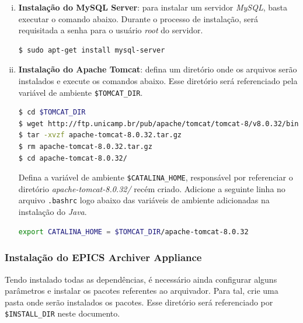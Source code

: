 \begin {enumerate}[i.]
\begin{lstlisting}[language=bash, style=nonumbers]
export JAVA_HOME="/usr/lib/jvm/java-8-openjdk-amd64"
export JRE_HOME="/usr/lib/jvm/java-8-openjdk-amd64/jre"
\end{lstlisting}

\item \textbf{Instalação do MySQL Server}: para instalar um servidor
\textit{MySQL}, basta executar o comando abaixo. Durante o processo de
instalação, será requisitada a senha para o usuário \textit{root} do servidor. 
\begin{lstlisting}[language=bash, style=nonumbers]
$ sudo apt-get install mysql-server
\end{lstlisting}

\item \textbf{Instalação do Apache Tomcat}: defina um diretório onde os arquivos
serão instalados e execute os comandos abaixo. Esse diretório será referenciado
pela variável de ambiente \texttt{\$TOMCAT\_DIR}.

\begin{lstlisting}[language=bash, style=nonumbers]
$ cd $TOMCAT_DIR
$ wget http://ftp.unicamp.br/pub/apache/tomcat/tomcat-8/v8.0.32/bin/apache-tomcat-8.0.32.tar.gz
$ tar -xvzf apache-tomcat-8.0.32.tar.gz
$ rm apache-tomcat-8.0.32.tar.gz
$ cd apache-tomcat-8.0.32/
\end{lstlisting}

Defina a variável de ambiente \texttt{\$CATALINA\_HOME}, responsável por
referenciar o diretório \textit{apache-tomcat-8.0.32/} recém criado. Adicione a
seguinte linha no arquivo \texttt{.bashrc} logo abaixo das variáveis de ambiente
adicionadas na instalação do \textit{Java}.

\begin{lstlisting}[language=bash, style=nonumbers]
export CATALINA_HOME = $TOMCAT_DIR/apache-tomcat-8.0.32
\end{lstlisting}

\end{enumerate} 

\subsubsection {Instalação do EPICS Archiver Appliance}

Tendo instalado todas as dependências, é necessário ainda configurar
alguns parâmetros e instalar os pacotes referentes ao arquivador. Para tal, crie
uma pasta onde serão instalados os pacotes. Esse diretório será referenciado por
\texttt{\$INSTALL\_DIR} neste documento.

